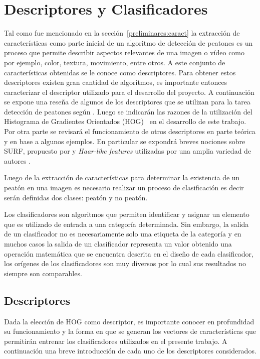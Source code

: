 \chapter{Descriptores y  Clasificadores}
\label{cap:caract}

Tal como fue mencionado en la sección~\ref{preliminares:caract} la extracción de características como parte inicial de un algoritmo de detección de peatones es un proceso que permite describir aspectos relevantes de una imagen o vídeo como por ejemplo, color, textura, movimiento, entre otros. A este conjunto de características obtenidas se le conoce como descriptores. Para obtener estos descriptores existen gran cantidad de algoritmos, es importante entonces caracterizar el descriptor utilizado para el desarrollo del proyecto. A continuación se expone una reseña de algunos de los descriptores que se utilizan para la tarea detección de peatones según \cite{dollar2012}. Luego se indicarán las razones de la utilización del Histograma de Gradientes Orientados (HOG)~\citep{dalal2005} en el desarrollo de este trabajo. Por otra parte se revisará el funcionamiento de otros descriptores en parte teórica y en base a algunos ejemplos. En particular se expondrá breves nociones sobre SURF, propuesto por \cite{Bay2006} y \textit{Haar-like features} utilizadas por una amplia variedad de autores \citep{Papageorgiou2000, viola2001, Lienhart2002}.  

Luego de la extracción de características para determinar la existencia de un peatón en una imagen es necesario realizar un proceso de clasificación es decir serán definidas dos clases: peatón y no peatón.

Los clasificadores son algoritmos que permiten identificar y asignar un elemento que es utilizado de entrada a una categoría determinada. Sin embargo, la salida de un clasificador no es necesariamente solo una etiqueta de la categoría y en muchos casos la salida de un clasificador representa un valor obtenido una operación matemática que se encuentra descrita en el diseño de cada clasificador, los orígenes de los clasificadores son muy diversos por lo cual sus resultados no siempre son comparables.

\section{Descriptores}
\label{caract:descriptores}

Dada la elección de HOG como descriptor, es importante conocer en profundidad su funcionamiento y la forma en que se generan los vectores de características que permitirán entrenar los clasificadores utilizados en el presente trabajo. A continuación una breve introducción de cada uno de los descriptores considerados. 

